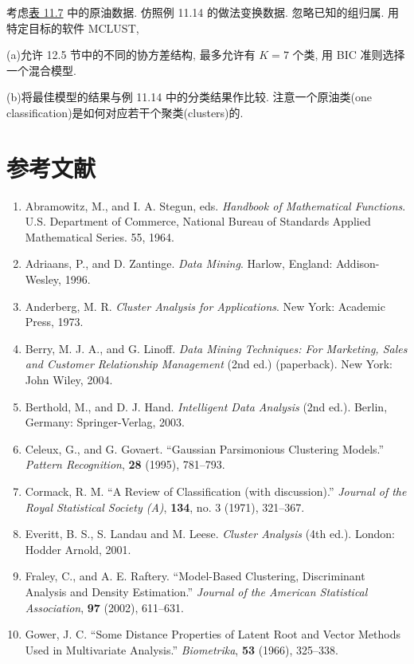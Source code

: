 
\quad 考虑\hyperref[tab:11.7]{表 11.7} 中的原油数据. 仿照例 11.14 的做法变换数据. 忽略已知的组归属. 用特定目标的软件 MCLUST,

\noindent (a)\quad 允许 12.5 节中的不同的协方差结构, 最多允许有 $K=7$ 个类, 用 BIC 准则选择一个混合模型.

\noindent (b)\quad 将最佳模型的结果与例 11.14 中的分类结果作比较. 注意一个原油类(one classification)是如何对应若干个聚类(clusters)的.

\label{bib:10}
\section*{参考文献}

\begin{enumerate}
\item Abramowitz, M., and I. A. Stegun, eds. \textit{Handbook of Mathematical Functions}. U.S. Department of Commerce, National Bureau of Standards Applied Mathematical Series. 55, 1964.
\item Adriaans, P., and D. Zantinge. \textit{Data Mining}. Harlow, England: Addison-Wesley, 1996.
\item Anderberg, M. R. \textit{Cluster Analysis for Applications}. New York: Academic Press, 1973.
\item Berry, M. J. A., and G. Linoff. \textit{Data Mining Techniques: For Marketing, Sales and Customer Relationship Management} (2nd ed.) (paperback). New York: John Wiley, 2004.
\item Berthold, M., and D. J. Hand. \textit{Intelligent Data Analysis} (2nd ed.). Berlin, Germany: Springer-Verlag, 2003.
\item Celeux, G., and G. Govaert. “Gaussian Parsimonious Clustering Models.” \textit{Pattern Recognition}, \textbf{28} (1995), 781--793.
\item Cormack, R. M. “A Review of Classification (with discussion).” \textit{Journal of the Royal Statistical Society (A)}, \textbf{134}, no. 3 (1971), 321--367.
\item Everitt, B. S., S. Landau and M. Leese. \textit{Cluster Analysis} (4th ed.). London: Hodder Arnold, 2001.
\item Fraley, C., and A. E. Raftery. “Model-Based Clustering, Discriminant Analysis and Density Estimation.” \textit{Journal of the American Statistical Association}, \textbf{97} (2002), 611--631.
\item Gower, J. C. “Some Distance Properties of Latent Root and Vector Methods Used in Multivariate Analysis.” \textit{Biometrika}, \textbf{53} (1966), 325--338.

\end{enumerate}
